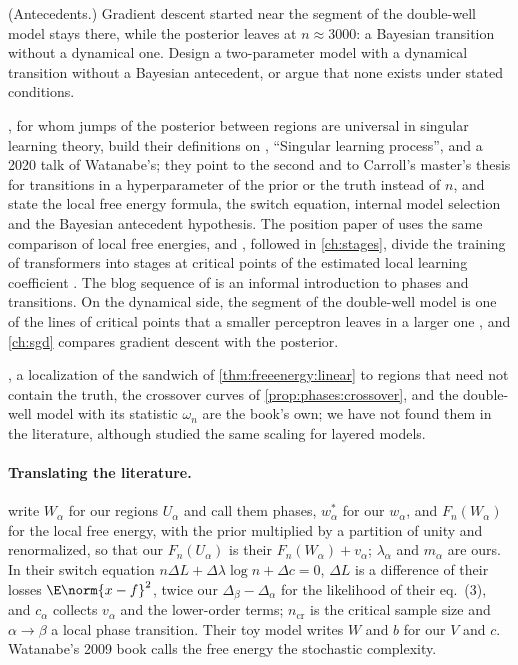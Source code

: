 \begin{refsection}
\begin{exercises}
\item \research (Antecedents.) Gradient descent started near the segment of the double-well model stays there, while the posterior leaves at $n\approx3000$: a Bayesian transition without a dynamical one. Design a two-parameter model with a dynamical transition without a Bayesian antecedent, or argue that none exists under stated conditions.\label{ex:phases:antecedent}
\end{exercises}

\notesandrefs
\Textcite{ChenEtAl2023}, for whom jumps of the posterior between regions are universal in singular learning theory, build their definitions on \textcite[\S7.6]{Watanabe2009}, ``Singular learning process'', \textcite[\S9.4]{Watanabe2018} and a 2020 talk of Watanabe's; they point to the second and to Carroll's master's thesis \parencite{Carroll2021} for transitions in a hyperparameter of the prior or the truth instead of $n$, and state the local free energy formula, the switch equation, internal model selection and the Bayesian antecedent hypothesis. The position paper of \textcite{PepinLehalleurEtAl2025} uses the same comparison of local free energies, and \textcite{HooglandEtAl2025}, followed in \cref{ch:stages}, divide the training of transformers into stages at critical points of the estimated local learning coefficient \parencite{LauEtAl2025}. The blog sequence of \textcite{Carroll2023} is an informal introduction to phases and transitions. On the dynamical side, the segment of the double-well model is one of the lines of critical points that a smaller perceptron leaves in a larger one \parencite{FukumizuAmari2000}, and \cref{ch:sgd} compares gradient descent with the posterior.

, a localization of the sandwich of \cref{thm:freeenergy:linear} to regions that need not contain the truth, the crossover curves of \cref{prop:phases:crossover}, and the double-well model with its statistic $\omega_n$ are the book's own; we have not found them in the literature, although \textcite{WatanabeAmari2003} studied the same scaling for layered models.

\paragraph{Translating the literature.} \Textcite{ChenEtAl2023} write $W_\alpha$ for our regions $U_\alpha$ and call them phases, $w^*_\alpha$ for our $w_\alpha$, and $F_n(W_\alpha)$ for the local free energy, with the prior multiplied by a partition of unity and renormalized, so that our $F_n(U_\alpha)$ is their $F_n(W_\alpha)+v_\alpha$; $\lambda_\alpha$ and $m_\alpha$ are ours. In their switch equation $n\Delta L+\Delta\lambda\log n+\Delta c=0$, $\Delta L$ is a difference of their losses $\E\norm{x-f}^2$, twice our $\Delta_\beta-\Delta_\alpha$ for the likelihood of their eq.~(3), and $c_\alpha$ collects $v_\alpha$ and the lower-order terms; $n_{\mathrm{cr}}$ is the critical sample size and $\alpha\to\beta$ a local phase transition. Their toy model writes $W$ and $b$ for our $V$ and $c$. Watanabe's 2009 book calls the free energy the stochastic complexity.

\printchapterbib
\end{refsection}
